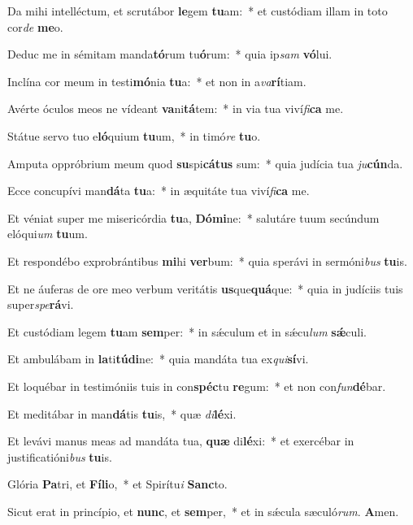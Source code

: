 ﻿\item Da mihi intelléctum, et scrutábor \textbf{le}gem \textbf{tu}am:~* et custódiam illam in toto cor\emph{de} \textbf{me}o.

\item Deduc me in sémitam manda\textbf{tó}rum tu\textbf{ó}rum:~* quia ip\emph{sam} \textbf{vó}lui.

\item Inclína cor meum in testi\textbf{mó}nia \textbf{tu}a:~* et non in a\emph{va}\textbf{rí}tiam.

\item Avérte óculos meos ne vídeant \textbf{va}ni\textbf{tá}tem:~* in via tua viví\emph{fi}\textbf{ca} me.

\item Státue servo tuo e\textbf{ló}quium \textbf{tu}um,~* in timó\emph{re} \textbf{tu}o.

\item Amputa oppróbrium meum quod \textbf{su}spi\textbf{cá}\textbf{tus} sum:~* quia judícia tua \emph{ju}\textbf{cún}da.

\item Ecce concupívi man\textbf{dá}ta \textbf{tu}a:~* in æquitáte tua viví\emph{fi}\textbf{ca} me.

\item Et véniat super me misericórdia \textbf{tu}a, \textbf{Dó}\textbf{mi}ne:~* salutáre tuum secúndum elóqui\emph{um} \textbf{tu}um.

\item Et respondébo exprobrántibus \textbf{mi}hi \textbf{ver}bum:~* quia sperávi in sermóni\emph{bus} \textbf{tu}is.

\item Et ne áuferas de ore meo verbum veritátis \textbf{us}que\textbf{quá}que:~* quia in judíciis tuis super\emph{spe}\textbf{rá}vi.

\item Et custódiam legem \textbf{tu}am \textbf{sem}per:~* in sǽculum et in sǽcu\emph{lum} \textbf{sǽ}culi.

\item Et ambulábam in \textbf{la}ti\textbf{tú}\textbf{di}ne:~* quia mandáta tua ex\emph{qui}\textbf{sí}vi.

\item Et loquébar in testimóniis tuis in con\textbf{spéc}tu \textbf{re}gum:~* et non con\emph{fun}\textbf{dé}bar.

\item Et meditábar in man\textbf{dá}tis \textbf{tu}is,~* quæ \emph{di}\textbf{lé}xi.

\item Et levávi manus meas ad mandáta tua, \textbf{quæ} di\textbf{lé}xi:~* et exercébar in justificatióni\emph{bus} \textbf{tu}is.

\item Glória \textbf{Pa}tri, et \textbf{Fí}\textbf{li}o,~* et Spirítu\emph{i} \textbf{Sanc}to.

\item Sicut erat in princípio, et \textbf{nunc}, et \textbf{sem}per,~* et in sǽcula sæculó\emph{rum}. \textbf{A}men.